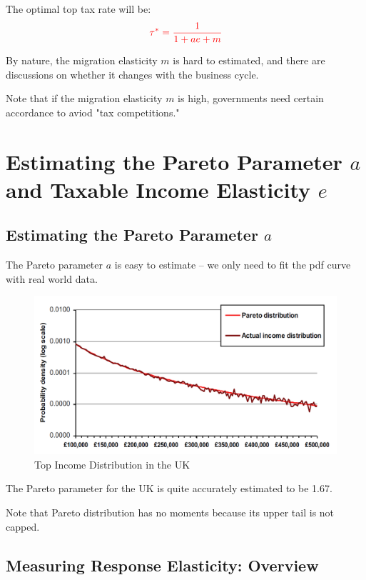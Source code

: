             The optimal top tax rate will be:
            \begin{equation}
                \color{red}
                    \tau^* = \frac{1}{1+ae+m}
            \end{equation}

            By nature, the migration elasticity $m$ is hard to estimated, and there are discussions on whether it changes with the business cycle.

            Note that if the migration elasticity $m$ is high, governments need certain accordance to aviod "tax competitions."


    \section{Estimating the Pareto Parameter $a$ and Taxable Income Elasticity $e$}

        \subsection{Estimating the Pareto Parameter $a$}

            The Pareto parameter $a$ is easy to estimate -- we only need to fit the pdf curve with real world data.

            \begin{figure}[H]
                \centering
                \includegraphics[width=4.5in]{images/ch13/13_UK_Pareto_para.png}
                \caption{Top Income Distribution in the UK}
            \end{figure}

            The Pareto parameter for the UK is quite accurately estimated to be 1.67.

            Note that Pareto distribution has no moments because its upper tail is not capped.

        \subsection{Measuring Response Elasticity: Overview}

